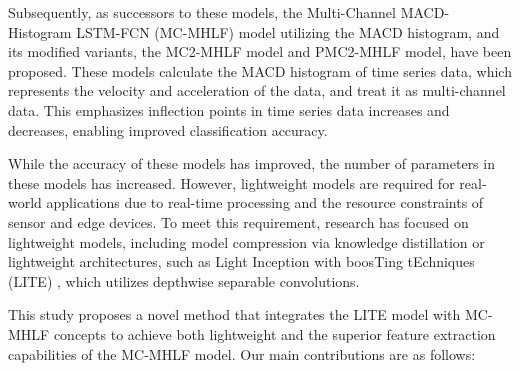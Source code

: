 \documentclass[conference]{IEEEtran}
\begin{document}
Subsequently, as successors to these models, the Multi-Channel MACD-Histogram LSTM-FCN (MC-MHLF) model utilizing the MACD histogram\cite{murphy1999technical}, and its modified variants, the MC2-MHLF model and PMC2-MHLF model\cite{10335821}, have been proposed. These models calculate the MACD histogram of time series data, which represents the velocity and acceleration of the data, and treat it as multi-channel data. This emphasizes inflection points in time series data increases and decreases, enabling improved classification accuracy.

While the accuracy of these models has improved, the number of parameters in these models has increased. However, lightweight models are required for real-world applications due to real-time processing and the resource constraints of sensor and edge devices. To meet this requirement, research has focused on lightweight models, including model compression via knowledge distillation or lightweight architectures, such as Light Inception with boosTing tEchniques (LITE) \cite{Ismail-Fawaz2023LITELightInception,ismail2025look}, which utilizes depthwise separable convolutions.

This study proposes a novel method that integrates the LITE model with MC-MHLF concepts to achieve both lightweight and the superior feature extraction capabilities of the MC-MHLF model. Our main contributions are as follows:
\end{document}
